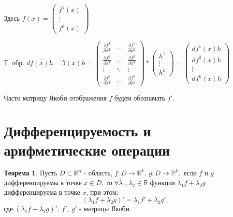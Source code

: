 \documentclass{report}
\theoremstyle{definition}
\newtheorem*{theorem}{Теорема}
\begin{document}
Здесь $f(x) = \left(
    \begin{array}{c}
            f^1(x) \\
            \vdots \\
            f^k(x)
        \end{array}
    \right)$

Т. обр. $df(x)h = \mathfrak{I}(x)h = \left(
    \begin{array}{ccc}
            \frac{\partial f^1}{\partial x^1} & \ldots & \frac{\partial f^1}{\partial x^n} \\
            \frac{\partial f^2}{\partial x^1} & \ldots & \frac{\partial f^2}{\partial x^n} \\
            \vdots                            & \ddots & \vdots                            \\
            \frac{\partial f^k}{\partial x^1} & \ldots & \frac{\partial f^k}{\partial x^n}
        \end{array}
    \right) * \left(
    \begin{array}{c}
            h^1    \\
            \vdots \\
            h^k
        \end{array}
    \right) = \left(
    \begin{array}{ccc}
            df^1(x)h \\
            df^2(x)h \\
            \vdots   \\
            df^k(x)h
        \end{array}
    \right)$

Часто матрицу Якоби отображения $f$ будем обозначать $f'$.

\section{Дифференцируемость и арифметические операции}

\begin{theorem}
    Пусть $D\subset \mathbb{R}^n$ - область, $f:D\rightarrow\mathbb{R}^k, \ g:D\rightarrow\mathbb{R}^k,$ если
    $f$ и $g$ дифференцируемы в точке $x\in D$, то $\forall \lambda_1,\lambda_2\in\mathbb{R}$ функция
    $\lambda_1 f + \lambda_2 g$ дифференцируема в точке $x$, при этом:
    \begin{equation*}
        (\lambda_1f + \lambda_2g)' = \lambda_1f' + \lambda_2g',
    \end{equation*}
    где $(\lambda_1f + \lambda_2g)', \ f', \ g'$ - матрицы Якоби.
\end{theorem}
\end{document}
